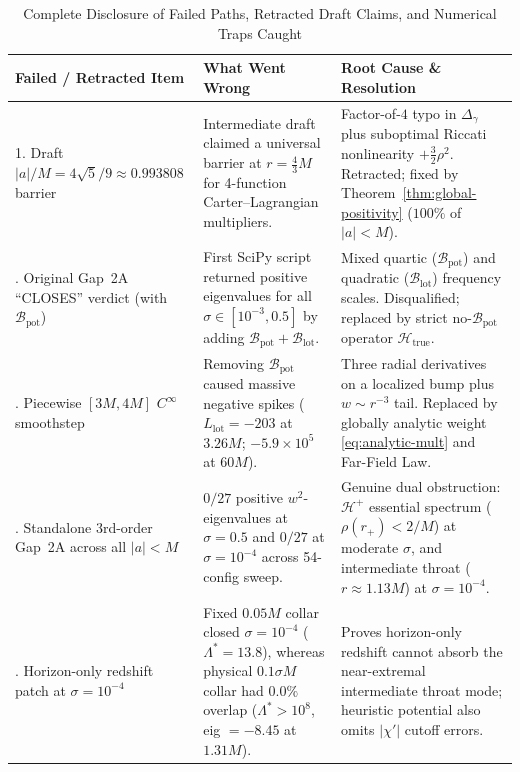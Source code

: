 \documentclass[11pt, a4paper]{article}
\theoremstyle{remark}
\begin{document}
\begin{table}[h]
\centering
\caption{Complete Disclosure of Failed Paths, Retracted Draft Claims, and Numerical Traps Caught}
\label{tab:failures}
\small
\begin{tabular}{@{}p{3.6cm}p{4.8cm}p{6.5cm}@{}}
\toprule
\textbf{Failed / Retracted Item} & \textbf{What Went Wrong} & \textbf{Root Cause \& Resolution} \\
\midrule
1. Draft $|a|/M = 4\sqrt{5}/9 \approx 0.993808$ barrier & Intermediate draft claimed a universal barrier at $r = \frac{4}{3}M$ for 4-function Carter--Lagrangian multipliers. & Factor-of-$4$ typo in $\Delta_\gamma$ plus suboptimal Riccati nonlinearity $+\frac{3}{2}\rho^2$. Retracted; fixed by Theorem~\ref{thm:global-positivity} ($100\%$ of $|a| < M$). \\
\addlinespace[4pt]
2. Original Gap~2A ``CLOSES'' verdict (with $\mathcal{B}_{\mathrm{pot}}$) & First SciPy script returned positive eigenvalues for all $\sigma \in [10^{-3}, 0.5]$ by adding $\mathcal{B}_{\mathrm{pot}} + \mathcal{B}_{\mathrm{lot}}$. & Mixed quartic ($\mathcal{B}_{\mathrm{pot}}$) and quadratic ($\mathcal{B}_{\mathrm{lot}}$) frequency scales. Disqualified; replaced by strict no-$\mathcal{B}_{\mathrm{pot}}$ operator $\mathcal{H}_{\mathrm{true}}$. \\
\addlinespace[4pt]
3. Piecewise $[3M, 4M]$ $C^\infty$ smoothstep & Removing $\mathcal{B}_{\mathrm{pot}}$ caused massive negative spikes ($L_{\mathrm{lot}} = -203$ at $3.26M$; $-5.9\times 10^5$ at $60M$). & Three radial derivatives on a localized bump plus $w \sim r^{-3}$ tail. Replaced by globally analytic weight \eqref{eq:analytic-mult} and Far-Field Law. \\
\addlinespace[4pt]
4. Standalone 3rd-order Gap~2A across all $|a| < M$ & $0/27$ positive $w^2$-eigenvalues at $\sigma = 0.5$ and $0/27$ at $\sigma = 10^{-4}$ across 54-config sweep. & Genuine dual obstruction: $\mathcal{H}^+$ essential spectrum ($\rho(r_+) < 2/M$) at moderate $\sigma$, and intermediate throat ($r \approx 1.13M$) at $\sigma = 10^{-4}$. \\
\addlinespace[4pt]
5. Horizon-only redshift patch at $\sigma = 10^{-4}$ & Fixed $0.05M$ collar closed $\sigma = 10^{-4}$ ($\Lambda^* = 13.8$), whereas physical $0.1\sigma M$ collar had $0.0\%$ overlap ($\Lambda^* > 10^8$, eig $= -8.45$ at $1.31M$). & Proves horizon-only redshift cannot absorb the near-extremal intermediate throat mode; heuristic potential also omits $|\chi'|$ cutoff errors. \\
\bottomrule
\end{tabular}
\end{table}
\end{document}
